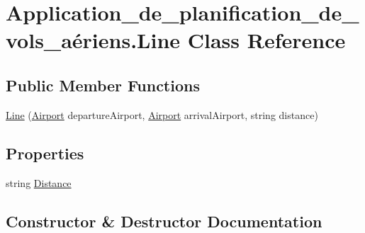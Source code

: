 \hypertarget{class_application__de__planification__de__vols__a_xC3_xA9riens_1_1_line}{}\section{Application\+\_\+de\+\_\+planification\+\_\+de\+\_\+vols\+\_\+aériens.\+Line Class Reference}
\label{class_application__de__planification__de__vols__a_xC3_xA9riens_1_1_line}
\subsection*{Public Member Functions}
\begin{DoxyCompactItemize}
\item 
\hyperlink{class_application__de__planification__de__vols__a_xC3_xA9riens_1_1_line_ac5938e9893f26cf7224e4bc65e919bb7}{Line} (\hyperlink{class_application__de__planification__de__vols__a_xC3_xA9riens_1_1_airport}{Airport} departure\+Airport, \hyperlink{class_application__de__planification__de__vols__a_xC3_xA9riens_1_1_airport}{Airport} arrival\+Airport, string distance)
\end{DoxyCompactItemize}
\subsection*{Properties}
\begin{DoxyCompactItemize}
\item 
string \hyperlink{class_application__de__planification__de__vols__a_xC3_xA9riens_1_1_line_ab20aa426dca4af775b0029f44c9b607d}{Distance}
\end{DoxyCompactItemize}


\subsection{Constructor \& Destructor Documentation}
\mbox{\label{class_application__de__planification__de__vols__a_xC3_xA9riens_1_1_line_ac5938e9893f26cf7224e4bc65e919bb7}} 
